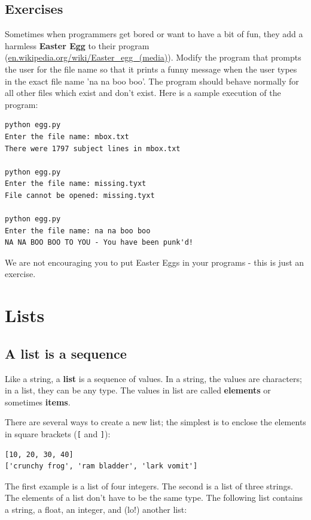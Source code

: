 \documentclass[10pt]{book}
\begin{document}
\section{Exercises}


\begin{ex}
Sometimes when programmers get bored or want to have a bit of fun,
they add a harmless {\bf Easter Egg} to their program 
(\url{en.wikipedia.org/wiki/Easter_egg_(media)}). Modify the program
that prompts the user for the file name so that it prints a funny
message when the user types in the exact file name 'na na boo boo'. 
The program should behave normally for all other files which exist
and don't exist.  Here is a sample execution of the program:

\beforeverb
\begin{verbatim}
python egg.py 
Enter the file name: mbox.txt
There were 1797 subject lines in mbox.txt

python egg.py 
Enter the file name: missing.tyxt
File cannot be opened: missing.tyxt

python egg.py 
Enter the file name: na na boo boo
NA NA BOO BOO TO YOU - You have been punk'd!
\end{verbatim}
\afterverb
%
We are not encouraging you to put Easter Eggs in your programs -
this is just an exercise.

\end{ex}

\chapter{Lists}



\section{A list is a sequence}

Like a string, a {\bf list} is a sequence of values.  In a string, the
values are characters; in a list, they can be any type.  The values in
list are called {\bf elements} or sometimes {\bf items}.


There are several ways to create a new list; the simplest is to
enclose the elements in square brackets (\verb"[" and \verb"]"):

\beforeverb
\begin{verbatim}
[10, 20, 30, 40]
['crunchy frog', 'ram bladder', 'lark vomit']
\end{verbatim}
\afterverb
%
The first example is a list of four integers.  The second is a list of
three strings.  The elements of a list don't have to be the same type.
The following list contains a string, a float, an integer, and
(lo!) another list:
\end{document}
